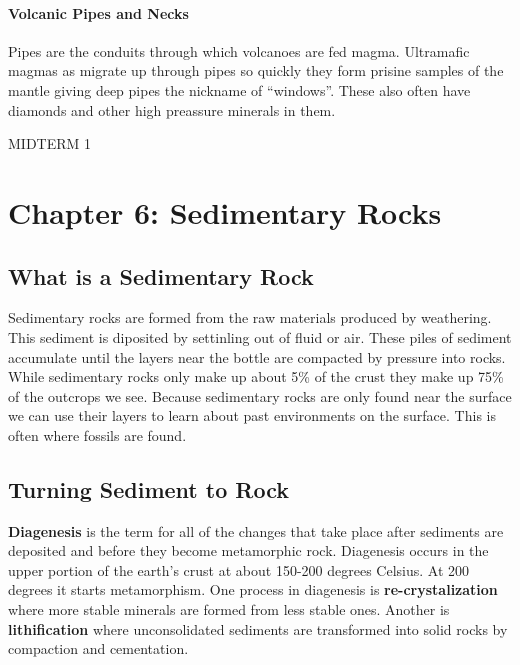 \documentclass{article}
\begin{document}
\paragraph{Volcanic Pipes and Necks} %
\label{par:volcanic_pipes_and_necks}
Pipes are the conduits through which volcanoes are fed magma. Ultramafic magmas as migrate up through pipes so quickly they form prisine samples of the mantle giving deep pipes the nickname of ``windows''. These also often have diamonds and other high preassure minerals in them.


\newpage
MIDTERM 1
\newpage
\section{Chapter 6: Sedimentary Rocks} %
\label{sec:chapter_6_sedimentary_rocks}
\subsection{What is a Sedimentary Rock} %
\label{sub:what_is_a_sedimentary_rock}
Sedimentary rocks are formed from the raw materials produced by weathering. This sediment is diposited by settinling out of fluid or air. These piles of sediment accumulate until the layers near the bottle are compacted by pressure into rocks. While sedimentary rocks only make up about 5\% of the crust they make up 75\% of the outcrops we see. Because sedimentary rocks are only found near the surface we can use their layers to learn about past environments on the surface. This is often where fossils are found.

\subsection{Turning Sediment to Rock} %
\label{sub:turning_sediment_to_rock}
\textbf{Diagenesis} is the term for all of the changes that take place after sediments are deposited and before they become metamorphic rock. Diagenesis occurs in the upper portion of the earth's crust at about 150-200 degrees Celsius. At 200 degrees it starts metamorphism. One process in diagenesis is \textbf{re-crystalization} where more stable minerals are formed from less stable ones. Another is \textbf{lithification} where unconsolidated sediments are transformed into solid rocks by compaction and cementation.
\end{document}
